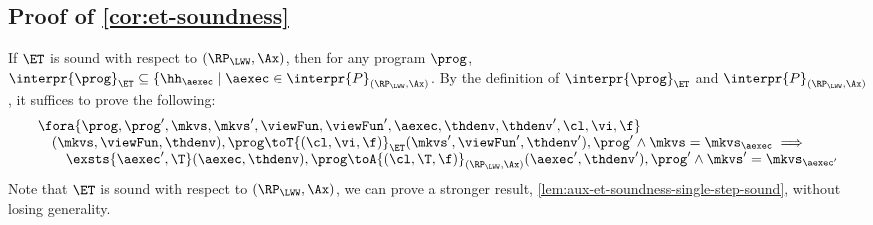 \subsection{Proof of \cref{cor:et-soundness}}
\label{sec:cor-et-soundness}

If $\ET$ is sound with respect to $(\RP_{\LWW}, \Ax)$, then 
for any program $\prog$, $\interpr{\prog}_{\ET} \subseteq \{ \hh_{\aexec} \mid \aexec \in \interpr{P}_{(\RP_{\LWW}, \Ax)}$.
By the definition of \( \interpr{\prog}_{\ET} \) and \( \interpr{P}_{(\RP_{\LWW}, \Ax)} \), it suffices to prove the following:
\[
\begin{array}{@{}l@{}}
    \fora{\prog,\prog',\mkvs,\mkvs',\viewFun,\viewFun',\aexec,\thdenv,\thdenv',\cl,\vi,\f} \\
    \quad (\mkvs, \viewFun, \thdenv), \prog \toT{(\cl, \vi, \f)}_{\ET} (\mkvs', \viewFun', \thdenv'), \prog'
    \land \mkvs = \mkvs_{\aexec}
    \implies {} \\
    \qquad \exsts{\aexec',\T}
    (\aexec, \thdenv), \prog \toA{(\cl, \T, \f)}_{(\RP_{\LWW}, \Ax)} (\aexec', \thdenv'), \prog' 
    \land \mkvs' = \mkvs_{\aexec'}  
\end{array}
\]
Note that \( \ET \) is sound with respect to \( (\RP_{\LWW}, \Ax) \), we can prove a stronger result, \ie \cref{lem:aux-et-soundness-single-step-sound}, without losing generality.


